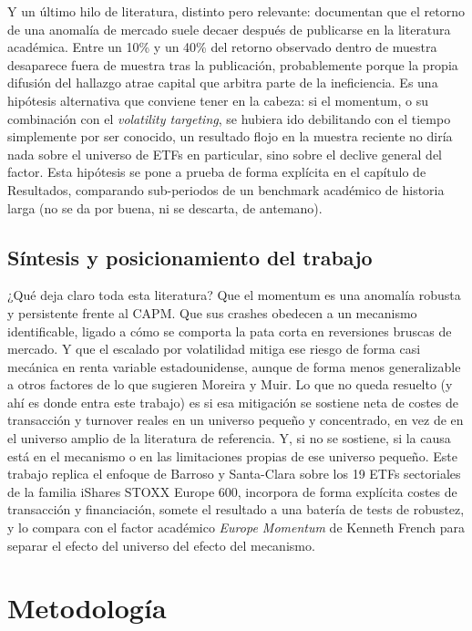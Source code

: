\documentclass[12pt]{report} %
\begin{document}
Y un último hilo de literatura, distinto pero relevante: \citet{mcleanpontiff2016} documentan que el retorno de una anomalía de mercado suele decaer después de publicarse en la literatura académica. Entre un 10\% y un 40\% del retorno observado dentro de muestra desaparece fuera de muestra tras la publicación, probablemente porque la propia difusión del hallazgo atrae capital que arbitra parte de la ineficiencia. Es una hipótesis alternativa que conviene tener en la cabeza: si el momentum, o su combinación con el \textit{volatility targeting}, se hubiera ido debilitando con el tiempo simplemente por ser conocido, un resultado flojo en la muestra reciente no diría nada sobre el universo de ETFs en particular, sino sobre el declive general del factor. Esta hipótesis se pone a prueba de forma explícita en el capítulo de Resultados, comparando sub-periodos de un benchmark académico de historia larga (no se da por buena, ni se descarta, de antemano).

\section{Síntesis y posicionamiento del trabajo}

¿Qué deja claro toda esta literatura? Que el momentum es una anomalía robusta y persistente frente al CAPM. Que sus crashes obedecen a un mecanismo identificable, ligado a cómo se comporta la pata corta en reversiones bruscas de mercado. Y que el escalado por volatilidad mitiga ese riesgo de forma casi mecánica en renta variable estadounidense, aunque de forma menos generalizable a otros factores de lo que sugieren Moreira y Muir. Lo que no queda resuelto (y ahí es donde entra este trabajo) es si esa mitigación se sostiene neta de costes de transacción y turnover reales en un universo pequeño y concentrado, en vez de en el universo amplio de la literatura de referencia. Y, si no se sostiene, si la causa está en el mecanismo o en las limitaciones propias de ese universo pequeño. Este trabajo replica el enfoque de Barroso y Santa-Clara sobre los 19 ETFs sectoriales de la familia iShares STOXX Europe 600, incorpora de forma explícita costes de transacción y financiación, somete el resultado a una batería de tests de robustez, y lo compara con el factor académico \textit{Europe Momentum} de Kenneth French para separar el efecto del universo del efecto del mecanismo.


\chapter{Metodología}
\end{document}
